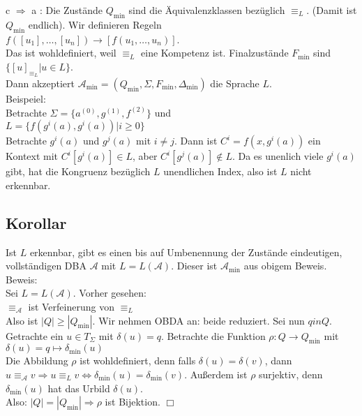 \documentclass[titlepage]{article}
\begin{document}
\glqq c $\Rightarrow$ a \grqq:
Die Zust\"ande $Q_\text{min}$ sind die \"Aquivalenzklassen bez\"uglich $\equiv_L$.
(Damit ist $Q_\text{min}$ endlich). Wir definieren Regeln\\
$f([u_1], \dots, [u_n]) \rightarrow [f(u_1, \dots, u_n)]$.\\
Das ist wohldefiniert, weil $\equiv_L$ eine Kompetenz ist.
Finalzust\"ande $F_\text{min}$ sind $\{ [u]_{\equiv_L} | u \in L \}$.\\
Dann akzeptiert $\mathcal{A}_\text{min} = (Q_\text{min}, \Sigma, F_\text{min}, 
\Delta_\text{min})$ die Sprache $L$.\\

Beispeiel:\\
Betrachte $\Sigma = \{a^{(0)}, g^{(1)}, f^{(2)} \}$ und \\
$L = \{ f(g^i(a), g^i(a)) | i \geq 0\}$\\

Betrachte $g^i(a)$ und $g^j(a)$ mit $i \neq j$.
Dann ist $C^i = f(x, g^i(a))$ ein Kontext mit $C^i[g^i(a)] \in L$, aber 
$C^i[g^j(a)] \notin L$.
Da es unenlich viele $g^i(a)$ gibt, hat die Kongruenz bez\"uglich $L$ unendlichen Index, 
also ist $L$ nicht erkennbar.

\subsection{Korollar}

Ist $L$ erkennbar, gibt es einen bis auf Umbenennung der Zust\"ande eindeutigen, 
vollst\"andigen DBA $\mathcal{A}$ mit $L = L(\mathcal{A})$.
Dieser ist $\mathcal{A}_\text{min}$ aus obigem Beweis.\\
Beweis:\\
Sei $L = L(\mathcal{A})$. Vorher gesehen:\\
$\equiv_\mathcal{A}$ ist Verfeinerung von $\equiv_L$\\
Also ist $|Q| \geq |Q_\text{min}|$. Wir nehmen OBDA an:
beide reduziert. Sei nun $q in Q$. Getrachte ein $u \in T_\Sigma$ mit $\delta(u) = q$.
Betrachte die Funktion $\rho : Q \to Q_\text{min}$ mit 
$\delta(u) = q \mapsto \delta_\text{min}(u)$\\
Die Abbildung $\rho$ ist wohldefiniert, denn falls $\delta (u) = \delta (v)$, dann 
$u \equiv_\mathcal{A} v \Rightarrow u \equiv_L v \Leftrightarrow \delta_\text{min} (u) = 
\delta_\text{min} (v)$.
Au\ss erdem ist $\rho$ surjektiv, denn $\delta_\text{min} (u)$ hat das Urbild $\delta(u)$.\\
Also: $|Q| = |Q_\text{min}| \Rightarrow \rho$ ist Bijektion. $\Box$
\end{document}
